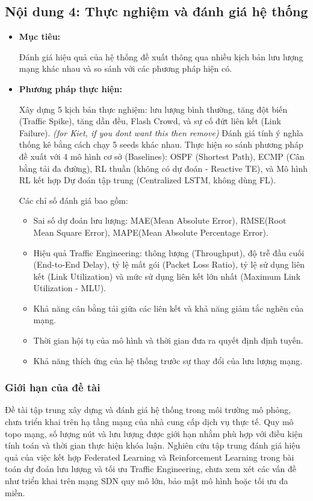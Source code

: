 \subsection{Nội dung 4: Thực nghiệm và đánh giá hệ thống}

\begin{itemize}
    \item \textbf{Mục tiêu:}

    Đánh giá hiệu quả của hệ thống đề xuất thông qua nhiều kịch bản lưu lượng mạng khác nhau và so sánh với các phương pháp hiện có.

    \item \textbf{Phương pháp thực hiện:}

    Xây dựng 5 kịch bản thực nghiệm: lưu lượng bình thường, tăng đột biến (Traffic Spike), tăng dần đều, Flash Crowd, và sự cố đứt liên kết (Link Failure). \textit{(for Kiet, if you dont want this then remove)} Đánh giá tính ý nghĩa thống kê bằng cách chạy 5 seeds khác nhau. Thực hiện so sánh phương pháp đề xuất với 4 mô hình cơ sở (Baselines): OSPF (Shortest Path), ECMP (Cân bằng tải đa đường), RL thuần (không có dự đoán - Reactive TE), và Mô hình RL kết hợp Dự đoán tập trung (Centralized LSTM, không dùng FL).

    Các chỉ số đánh giá bao gồm:
    \begin{itemize}
    \item Sai số dự đoán lưu lượng: MAE(Mean Absolute Error), RMSE(Root Mean Square Error), MAPE(Mean Absolute Percentage Error).
    
    \item Hiệu quả Traffic Engineering: thông lượng (Throughput), độ trễ đầu cuối (End-to-End Delay), tỷ lệ mất gói (Packet Loss Ratio), tỷ lệ sử dụng liên kết (Link Utilization) và mức sử dụng liên kết lớn nhất (Maximum Link Utilization - MLU).

    \item Khả năng cân bằng tải giữa các liên kết và khả năng giảm tắc nghẽn của mạng.

    \item Thời gian hội tụ của mô hình và thời gian đưa ra quyết định định tuyến.

    \item Khả năng thích ứng của hệ thống trước sự thay đổi của lưu lượng mạng.
\end{itemize}
\end{itemize}

\subsubsection{Giới hạn của đề tài}

Đề tài tập trung xây dựng và đánh giá hệ thống trong môi trường mô phỏng, chưa triển khai trên hạ tầng mạng của nhà cung cấp dịch vụ thực tế. Quy mô topo mạng, số lượng nút và lưu lượng được giới hạn nhằm phù hợp với điều kiện tính toán và thời gian thực hiện khóa luận. Nghiên cứu tập trung đánh giá hiệu quả của việc kết hợp Federated Learning và Reinforcement Learning trong bài toán dự đoán lưu lượng và tối ưu Traffic Engineering, chưa xem xét các vấn đề như triển khai trên mạng SDN quy mô lớn, bảo mật mô hình hoặc tối ưu đa miền.
